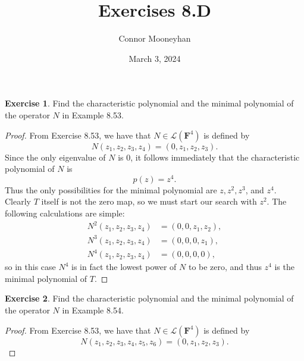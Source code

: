 \documentclass{article}
\title{Exercises 8.D}
\author{Connor Mooneyhan}
\date{March 3, 2024}
\theoremstyle{definition}
\newtheorem{ex}{Exercise}
\begin{document}
\maketitle

\begin{ex}
	Find the characteristic polynomial and the minimal polynomial of the operator $N$ in Example 8.53.
\end{ex}
\begin{proof}
	From Exercise 8.53, we have that $N \in \mathcal{L}(\mathbf{F}^4)$ is defined by \begin{equation*}
		N(z_1, z_2, z_3, z_4) = (0, z_1, z_2, z_3).
	\end{equation*}
	Since the only eigenvalue of $N$ is 0, it follows immediately that the characteristic polynomial of $N$ is \begin{equation*}
		p(z) = z^4.
	\end{equation*}
	Thus the only possibilities for the minimal polynomial are $z, z^2, z^3$, and $z^4$.
	Clearly $T$ itself is not the zero map, so we must start our search with $z^2$.
	The following calculations are simple: \begin{align*}
		N^2(z_1, z_2, z_3, z_4) & = (0, 0, z_1, z_2), \\
		N^3(z_1, z_2, z_3, z_4) & = (0, 0, 0, z_1),   \\
		N^4(z_1, z_2, z_3, z_4) & = (0, 0, 0, 0),
	\end{align*}
	so in this case $N^4$ is in fact the lowest power of $N$ to be zero, and thus $z^4$ is the minimal polynomial of $T$.
\end{proof}

\begin{ex}
	Find the characteristic polynomial and the minimal polynomial of the operator $N$ in Example 8.54.
\end{ex}
\begin{proof}
	From Exercise 8.53, we have that $N \in \mathcal{L}(\mathbf{F}^4)$ is defined by \begin{equation*}
		N(z_1, z_2, z_3, z_4, z_5, z_6) = (0, z_1, z_2, z_3).
	\end{equation*}
\end{proof}
\end{document}
